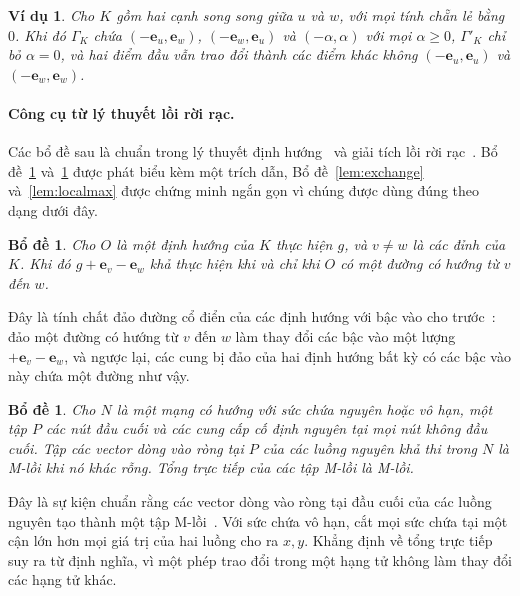 \documentclass[pdflatex,sn-mathphys-num]{sn-jnl}
\theoremstyle{thmstyleone}
\newtheorem{lemma}[theorem]{Bổ đề}
\theoremstyle{thmstyletwo}
\newtheorem{example}{Ví dụ}
\theoremstyle{thmstylethree}
\newcommand{\e}{\mathbf{e}}
\begin{document}
\begin{example}\label{ex:digon}
Cho $K$ gồm hai cạnh song song giữa $u$ và $w$, với mọi tính chẵn lẻ bằng $0$. Khi đó $\Gamma_K$ chứa $(-\e_u,\e_w)$, $(-\e_w,\e_u)$ và $(-\alpha,\alpha)$ với mọi $\alpha\ge0$, $\Gamma'_K$ chỉ bỏ $\alpha=0$, và hai điểm đầu vẫn trao đổi thành các điểm khác không $(-\e_u,\e_u)$ và $(-\e_w,\e_w)$.
\end{example}

\paragraph{Công cụ từ lý thuyết lồi rời rạc.}

Các bổ đề sau là chuẩn trong lý thuyết định hướng~\cite{hakimi1965,frank1980,frank2011} và giải tích lồi rời rạc~\cite{murota2003,fujishige2005}. Bổ đề~\ref{lem:reversal} và~\ref{lem:boundary} được phát biểu kèm một trích dẫn, Bổ đề~\ref{lem:exchange} và~\ref{lem:localmax} được chứng minh ngắn gọn vì chúng được dùng đúng theo dạng dưới đây.

\begin{lemma}\label{lem:reversal}
Cho $O$ là một định hướng của $K$ thực hiện $g$, và $v\ne w$ là các đỉnh của $K$. Khi đó $g+\e_v-\e_w$ khả thực hiện khi và chỉ khi $O$ có một đường có hướng từ $v$ đến $w$.
\end{lemma}

Đây là tính chất đảo đường cổ điển của các định hướng với bậc vào cho trước~\cite{hakimi1965,frank1980,frank2011}: đảo một đường có hướng từ $v$ đến $w$ làm thay đổi các bậc vào một lượng $+\e_v-\e_w$, và ngược lại, các cung bị đảo của hai định hướng bất kỳ có các bậc vào này chứa một đường như vậy.

\begin{lemma}\label{lem:boundary}
Cho $N$ là một mạng có hướng với sức chứa nguyên hoặc vô hạn, một tập $P$ các nút đầu cuối và các cung cấp \emph{cố định} nguyên tại mọi nút không đầu cuối. Tập các vector dòng vào ròng tại $P$ của các luồng nguyên khả thi trong $N$ là M-lồi khi nó khác rỗng. Tổng trực tiếp của các tập M-lồi là M-lồi.
\end{lemma}

Đây là sự kiện chuẩn rằng các vector dòng vào ròng tại đầu cuối của các luồng nguyên tạo thành một tập M-lồi~\cite{murota2003,fujishige2005}. Với sức chứa vô hạn, cắt mọi sức chứa tại một cận lớn hơn mọi giá trị của hai luồng cho ra $x,y$. Khẳng định về tổng trực tiếp suy ra từ định nghĩa, vì một phép trao đổi trong một hạng tử không làm thay đổi các hạng tử khác.
\end{document}
